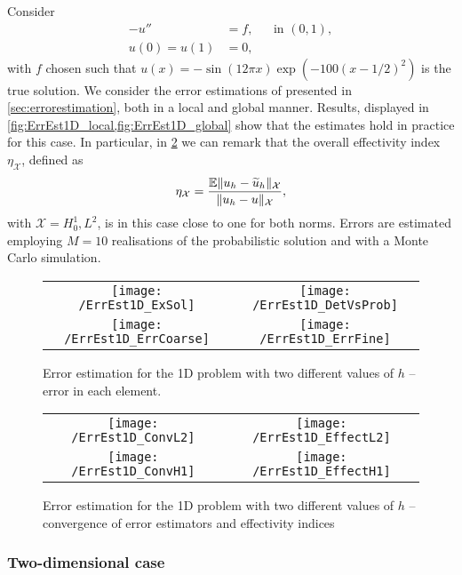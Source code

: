 Consider
\begin{equation}
\begin{aligned}
	-u'' &= f, &&\text{in } (0,1), \\
	u(0) = u(1) &= 0,
\end{aligned}
\end{equation}
with $f$ chosen such that $u(x) = -\sin(12\pi x) \exp(-100(x-1/2)^2)$ is the true solution. We consider the error estimations of presented in \cref{sec:errorestimation}, both in a local and global manner. Results, displayed in \cref{fig:ErrEst1D_local,fig:ErrEst1D_global} show that the estimates hold in practice for this case. In particular, in \cref{fig:ErrEst1D_global} we can remark that the overall effectivity index $\eta_{\mathcal X}$, defined as
\begin{equation}
	\eta_{\mathcal X} = \frac{\operatorname{\mathbb{E}}\lVert u_h - \widetilde u_h\rVert_{\mathcal X}}{\lVert u_h - u\rVert_{\mathcal X}},
\end{equation}
with $\mathcal X = H_0^1, L^2$, is in this case close to one for both norms. Errors are estimated employing $M = 10$ realisations of the probabilistic solution and with a Monte Carlo simulation.

\begin{figure}[t]
	\centering
	\begin{tabular}{cc}
		\texttt{[image: /ErrEst1D\_ExSol]} & \texttt{[image: /ErrEst1D\_DetVsProb]} \\
		\texttt{[image: /ErrEst1D\_ErrCoarse]} & \texttt{[image: /ErrEst1D\_ErrFine]} \\
	\end{tabular}
	\caption{Error estimation for the 1D problem with two different values of $h$ -- error in each element.}
	\label{fig:ErrEst1D_local}
\end{figure}

\begin{figure}[t]
	\centering
	\begin{tabular}{cc}
		\texttt{[image: /ErrEst1D\_ConvL2]} & \texttt{[image: /ErrEst1D\_EffectL2]} \\
		\texttt{[image: /ErrEst1D\_ConvH1]} & \texttt{[image: /ErrEst1D\_EffectH1]} \\
	\end{tabular}
	\caption{Error estimation for the 1D problem with two different values of $h$ -- convergence of error estimators and effectivity indices}
	\label{fig:ErrEst1D_global}
\end{figure}

\subsubsection*{Two-dimensional case}

